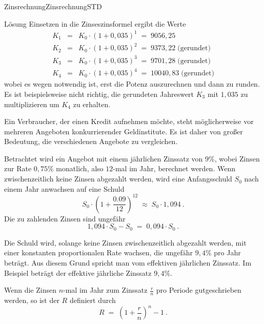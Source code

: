 \begin{MXContent}{Zinsrechnung}{Zinsrechnung}{STD}
\begin{MExercise}
\begin{MHint}{Lösung}
Einsetzen in die Zinseszinsformel ergibt die Werte
\begin{eqnarray*}
K_1 &=& K_0\cdot \left({1+0,035}\right)^1 \;=\; 9056,25\\
K_2 &=& K_0\cdot \left({1+0,035}\right)^2 \;=\; 9373,22\;\text{(gerundet)}\\
K_3 &=& K_0\cdot \left({1+0,035}\right)^3 \;=\; 9701,28\;\text{(gerundet)}\\
K_4 &=& K_0\cdot \left({1+0,035}\right)^4 \;=\; 10040,83\;\text{(gerundet)}
\end{eqnarray*}
wobei es wegen  notwendig ist, erst die Potenz auszurechnen und dann zu runden. Es ist beispielsweise nicht richtig,
die gerundeten Jahreswert $K_3$ mit $1,035$ zu multiplizieren um $K_4$ zu erhalten.
\end{MHint}
\end{MExercise}

Ein Verbraucher, der einen Kredit aufnehmen möchte, steht möglicherweise vor mehreren Angeboten konkurrierender Geldinstitute.
Es ist daher von großer Bedeutung, die verschiedenen Angebote zu vergleichen.

\begin{MExample}
Betrachtet wird ein Angebot mit einem jährlichen Zinssatz von $9\%$, wobei Zinsen zur Rate $0,75\%$ monatlich, also $12$-mal im Jahr,
berechnet werden. Wenn zwischenzeitlich keine Zinsen abgezahlt werden, wird eine Anfangsschuld $S_{0}$ nach einem Jahr anwachsen auf eine Schuld
$$
S_{0}\cdot \left({1+\frac{0.09}{12} }\right)^{12}\; \approx \; S_{0}\cdot 1,094\: .
$$
Die zu zahlenden Zinsen sind ungefähr
$$
1,094 \cdot S_{0}-S_{0}\; =\; 0,094 \cdot S_{0}\: .
$$
\end{MExample}

Die Schuld wird, solange keine Zinsen zwischenzeitlich abgezahlt werden, mit einer konstanten proportionalen Rate wachsen, die ungefähr $9,4\%$ pro Jahr beträgt.
Aus diesem Grund spricht man vom effektiven jährlichen Zinssatz. Im Beispiel beträgt der effektive jährliche Zinssatz $9,4\%$.

\begin{MInfo}
Wenn die Zinsen $n$-mal im Jahr zum Zinssatz $\frac{r}{n}$ pro Periode gutgeschrieben werden, so ist der  $R$ definiert durch
$$
R\; =\;\left({ 1+\frac{r}{n}}\right)^{n}-1\: .
$$
\end{MInfo}

\end{MXContent}

